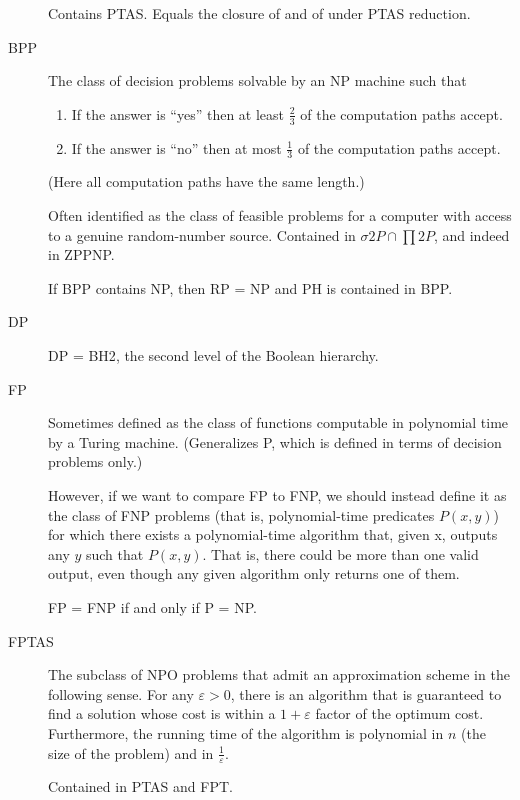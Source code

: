 \documentclass[a4paper]{article}
\newcommand{\cls}[1]{\rm{#1}}
\newcommand{\probl}[1]{\text{\textsc{#1}}}
\begin{document}
\begin{appendices}
\begin{description}
    Contains \cls{PTAS}. Equals the closure of \probl{MaxSNP} and of \probl{MaxNP} under \cls{PTAS} reduction.

  \item[\cls{BPP}] The class of decision problems solvable by an \cls{NP} machine such that
    \begin{enumerate}
      \item If the answer is ``yes'' then at least $\frac23$ of the computation paths accept.
      \item If the answer is ``no'' then at most $\frac13$ of the computation paths accept.
    \end{enumerate}
    (Here all computation paths have the same length.)

    Often identified as the class of feasible problems for a computer with access to a genuine random-number source.
    Contained in $\sigma 2P \cap \prod 2P$, and indeed in \cls{ZPPNP}.

    If \cls{BPP} contains \cls{NP}, then \cls{RP} = \cls{NP} and \cls{PH} is contained in \cls{BPP}.

  \item[\cls{DP}] \cls{DP} = \cls{BH2}, the second level of the Boolean hierarchy.

  \item[\cls{FP}] Sometimes defined as the class of functions computable in polynomial time by a Turing machine.  (Generalizes P, which is defined in terms of decision problems only.)

    However, if we want to compare \cls{FP} to \cls{FNP}, we should instead define it as the class of \cls{FNP} problems (that is, polynomial-time predicates $P(x,y)$) for which there exists a polynomial-time algorithm that, given x, outputs any $y$ such that $P(x,y)$.  That is, there could be more than one valid output, even though any given algorithm only returns one of them.

    \cls{FP} = \cls{FNP} if and only if \cls{P} = \cls{NP}.

  \item[\cls{FPTAS}] The subclass of \cls{NPO} problems that admit an approximation scheme in the following sense.  For any $\varepsilon > 0 $, there is an algorithm that is guaranteed to find a solution whose cost is within a $1 + \varepsilon$ factor of the optimum cost.  Furthermore, the running time of the algorithm is polynomial in $n$ (the size of the problem) and in $\frac1{\varepsilon}$.

    Contained in \cls{PTAS} and \cls{FPT}.


\end{description}
\end{appendices}
\end{document}
